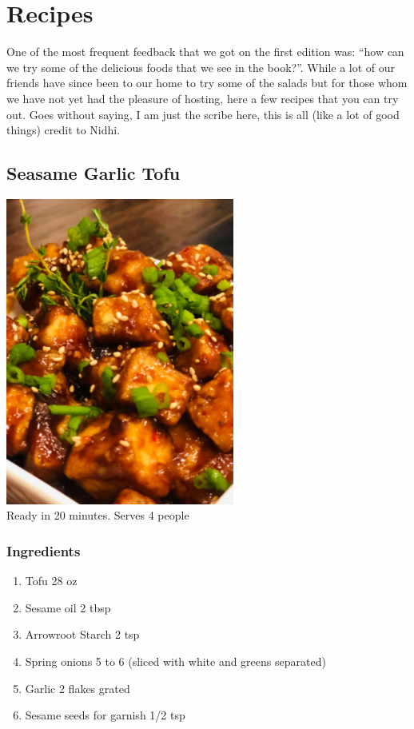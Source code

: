 \documentclass[
  oneside]{book}
\providecommand{\tightlist}{%
  \setlength{\itemsep}{0pt}\setlength{\parskip}{0pt}}
\begin{document}
\hypertarget{recipes}{%
\chapter{Recipes}\label{recipes}}

One of the most frequent feedback that we got on the first edition was: ``how can we try some of the delicious foods that we see in the book?''. While a lot of our friends have since been to our home to try some of the salads but for those whom we have not yet had the pleasure of hosting, here a few recipes that you can try out. Goes without saying, I am just the scribe here, this is all (like a lot of good things) credit to Nidhi.

\hypertarget{seasame-garlic-tofu}{%
\section{Seasame Garlic Tofu}\label{seasame-garlic-tofu}}

\includegraphics{pictures/Seasame-garlic-tofu.png}\\
Ready in 20 minutes. Serves 4 people

\hypertarget{ingredients}{%
\subsection{Ingredients}\label{ingredients}}

\begin{enumerate}
\def\labelenumi{\arabic{enumi}.}
\tightlist
\item
  Tofu 28 oz
\item
  Sesame oil 2 tbsp
\item
  Arrowroot Starch 2 tsp
\item
  Spring onions 5 to 6 (sliced with white and greens separated)
\item
  Garlic 2 flakes grated
\item
  Sesame seeds for garnish 1/2 tsp
\end{enumerate}
\end{document}
